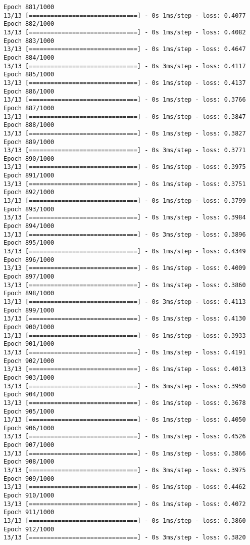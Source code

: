 \documentclass[11pt]{article}
\begin{document}
\begin{Verbatim}[commandchars=\\\{\}]
Epoch 881/1000
13/13 [==============================] - 0s 1ms/step - loss: 0.4077
Epoch 882/1000
13/13 [==============================] - 0s 1ms/step - loss: 0.4082
Epoch 883/1000
13/13 [==============================] - 0s 1ms/step - loss: 0.4647
Epoch 884/1000
13/13 [==============================] - 0s 3ms/step - loss: 0.4117
Epoch 885/1000
13/13 [==============================] - 0s 1ms/step - loss: 0.4137
Epoch 886/1000
13/13 [==============================] - 0s 1ms/step - loss: 0.3766
Epoch 887/1000
13/13 [==============================] - 0s 1ms/step - loss: 0.3847
Epoch 888/1000
13/13 [==============================] - 0s 1ms/step - loss: 0.3827
Epoch 889/1000
13/13 [==============================] - 0s 3ms/step - loss: 0.3771
Epoch 890/1000
13/13 [==============================] - 0s 1ms/step - loss: 0.3975
Epoch 891/1000
13/13 [==============================] - 0s 1ms/step - loss: 0.3751
Epoch 892/1000
13/13 [==============================] - 0s 1ms/step - loss: 0.3799
Epoch 893/1000
13/13 [==============================] - 0s 1ms/step - loss: 0.3984
Epoch 894/1000
13/13 [==============================] - 0s 3ms/step - loss: 0.3896
Epoch 895/1000
13/13 [==============================] - 0s 1ms/step - loss: 0.4349
Epoch 896/1000
13/13 [==============================] - 0s 1ms/step - loss: 0.4009
Epoch 897/1000
13/13 [==============================] - 0s 1ms/step - loss: 0.3860
Epoch 898/1000
13/13 [==============================] - 0s 3ms/step - loss: 0.4113
Epoch 899/1000
13/13 [==============================] - 0s 1ms/step - loss: 0.4130
Epoch 900/1000
13/13 [==============================] - 0s 1ms/step - loss: 0.3933
Epoch 901/1000
13/13 [==============================] - 0s 1ms/step - loss: 0.4191
Epoch 902/1000
13/13 [==============================] - 0s 1ms/step - loss: 0.4013
Epoch 903/1000
13/13 [==============================] - 0s 3ms/step - loss: 0.3950
Epoch 904/1000
13/13 [==============================] - 0s 1ms/step - loss: 0.3678
Epoch 905/1000
13/13 [==============================] - 0s 1ms/step - loss: 0.4050
Epoch 906/1000
13/13 [==============================] - 0s 1ms/step - loss: 0.4526
Epoch 907/1000
13/13 [==============================] - 0s 1ms/step - loss: 0.3866
Epoch 908/1000
13/13 [==============================] - 0s 3ms/step - loss: 0.3975
Epoch 909/1000
13/13 [==============================] - 0s 1ms/step - loss: 0.4462
Epoch 910/1000
13/13 [==============================] - 0s 1ms/step - loss: 0.4072
Epoch 911/1000
13/13 [==============================] - 0s 1ms/step - loss: 0.3860
Epoch 912/1000
13/13 [==============================] - 0s 3ms/step - loss: 0.3820

\end{Verbatim}
\end{document}
